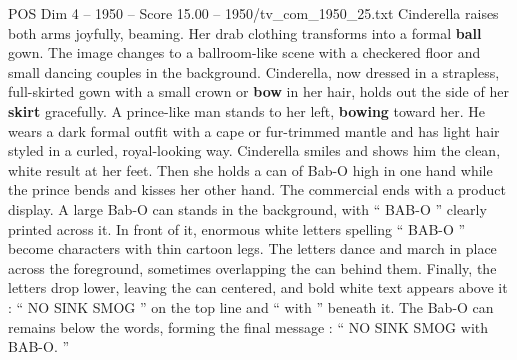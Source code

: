 \begin{textsample}{POS Dim 4 – 1950 – Score 15.00 – 1950/tv\_com\_1950\_25.txt}
Cinderella raises both arms joyfully, beaming.
Her drab clothing transforms into a formal \textbf{ball} gown.
The image changes to a ballroom-like scene with a checkered floor and small dancing couples in the background.
Cinderella, now dressed in a strapless, full-skirted gown with a small crown or \textbf{bow} in her hair, holds out the side of her \textbf{skirt} gracefully.
A prince-like man stands to her left, \textbf{bowing} toward her.
He wears a dark formal outfit with a cape or fur-trimmed mantle and has light hair styled in a curled, royal-looking way.
Cinderella smiles and shows him the clean, white result at her feet.
Then she holds a can of Bab-O high in one hand while the prince bends and kisses her other hand.
The commercial ends with a product display.
A large Bab-O can stands in the background, with “ BAB-O ” clearly printed across it.
In front of it, enormous white letters spelling “ BAB-O ” become characters with thin cartoon legs.
The letters dance and march in place across the foreground, sometimes overlapping the can behind them.
Finally, the letters drop lower, leaving the can centered, and bold white text appears above it : “ NO SINK SMOG ” on the top line and “ with ” beneath it.
The Bab-O can remains below the words, forming the final message : “ NO SINK SMOG with BAB-O. ”

\end{textsample}
